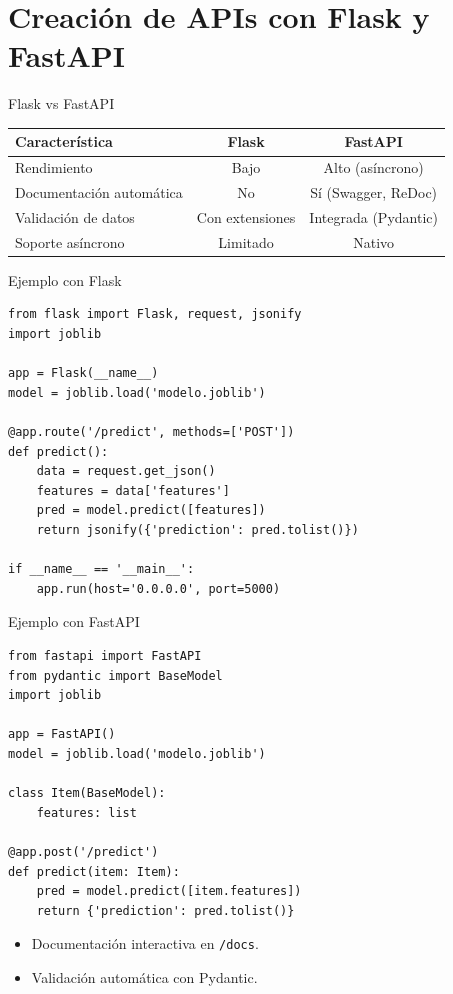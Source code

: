 \documentclass[aspectratio=169, 10pt, xcolor=table]{beamer}
\begin{document}
\section{Creación de APIs con Flask y FastAPI}

\begin{frame}{Flask vs FastAPI}
    \begin{table}
        \centering
        \begin{tabular}{l|c|c}
            \toprule
            \textbf{Característica} & \textbf{Flask} & \textbf{FastAPI} \\
            \midrule
            Rendimiento & Bajo & Alto (asíncrono) \\
            Documentación automática & No & Sí (Swagger, ReDoc) \\
            Validación de datos & Con extensiones & Integrada (Pydantic) \\
            Soporte asíncrono & Limitado & Nativo \\
            \bottomrule
        \end{tabular}
    \end{table}
\end{frame}

\begin{frame}[fragile]{Ejemplo con Flask}
    \begin{lstlisting}
from flask import Flask, request, jsonify
import joblib

app = Flask(__name__)
model = joblib.load('modelo.joblib')

@app.route('/predict', methods=['POST'])
def predict():
    data = request.get_json()
    features = data['features']
    pred = model.predict([features])
    return jsonify({'prediction': pred.tolist()})

if __name__ == '__main__':
    app.run(host='0.0.0.0', port=5000)
    \end{lstlisting}
\end{frame}

\begin{frame}[fragile]{Ejemplo con FastAPI}
    \begin{lstlisting}
from fastapi import FastAPI
from pydantic import BaseModel
import joblib

app = FastAPI()
model = joblib.load('modelo.joblib')

class Item(BaseModel):
    features: list

@app.post('/predict')
def predict(item: Item):
    pred = model.predict([item.features])
    return {'prediction': pred.tolist()}
    \end{lstlisting}
    \begin{itemize}
        \item Documentación interactiva en \texttt{/docs}.
        \item Validación automática con Pydantic.
    \end{itemize}
\end{frame}
\end{document}
